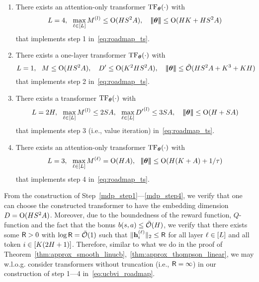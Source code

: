 \begin{enumerate}[label=Step \arabic*,ref= \arabic*]
    \item\label{mdp_step1}There exists an attention-only transformer ${\rm TF}_{\boldsymbol \theta}(\cdot)$ with     $$L=4,~~\max_{\ell\in[L]}M^{(l)}\leq {\mathrm{O}}({H}{S}^2{A}),~~~ {\left|\!\left|\!\left|{{\boldsymbol \theta}}\right|\!\right|\!\right|}\leq {\mathrm{O}}({H}{K}+{H}{S}^2{A}) $$
 that implements step 1 in~\eqref{eq:roadmap_ts}.
   \item \label{mdp_step2}
 There exists a one-layer  transformer ${\rm TF}_{\boldsymbol \theta}(\cdot)$ with
$$
L=1,~~{M}\leq {\mathrm{O}}({H}{S}^2{A}),~~~ {D'}\leq {\mathrm{O}}({K}^2{H}{S}^2{A}),~~~{\left|\!\left|\!\left|{{\boldsymbol \theta}}\right|\!\right|\!\right|}\leq {\tilde{\mathcal O}}({H}{S}^2{A}+{K}^3+{K}{H})
$$
 that implements step 2 in~\eqref{eq:roadmap_ts}.
  \item\label{mdp_step3}  There exists a transformer  ${\rm TF}_{{\boldsymbol \theta}}(\cdot)$ with
    $$L=2{H},~~\max_{\ell\in[L]}M^{(l)}\leq 2{S}{A},~~\max_{\ell\in[L]}{D'}^{(l)}\leq 3{S}{A},~~~ {\left|\!\left|\!\left|{{\boldsymbol \theta}}\right|\!\right|\!\right|}\leq  {\mathrm{O}}({H}+{S}{A}) $$
 that implements step 3 (i.e., value iteration) in~\eqref{eq:roadmap_ts}.
  \item \label{mdp_step4}
 There exists an attention-only transformer ${\rm TF}_{\boldsymbol \theta}(\cdot)$ with
$${L}=3,~~\max_{\ell\in[{L}]}{M}^{(\ell)}={\mathrm{O}}({H}{A}),~~{\left|\!\left|\!\left|{{\boldsymbol \theta}}\right|\!\right|\!\right|}\leq {\mathrm{O}}({H}({K}+{A})+{1}/{{\tau}}) $$
 that implements step 4 in~\eqref{eq:roadmap_ts}.
\end{enumerate}
From the construction of Step~\ref{mdp_step1}---\ref{mdp_step4}, we verify that one can choose the constructed transformer to have the embedding dimension $D={\mathrm{O}}({H}{S}^2{A})$. Moreover, due to the boundedness of the reward function, $Q$-function  and the fact that the bonus ${b}({s},{a})\leq{\tilde{\mathcal O}}({H})$, we verify that there exists some ${\mathsf{R}}>0$ with $\log {\mathsf{R}}={\tilde{\mathcal O}}(1)$ such that $\|{\mathbf h}_i^{{(\ell)}}\|_2\leq {\mathsf{R}}$ for all layer $\ell\in[{L}]$ and all token $i\in[{K}(2{H}+1)]$. Therefore, similar to what we do in the proof of Theorem~\ref{thm:approx_smooth_linucb},~\ref{thm:approx_thompson_linear}, we may w.l.o.g. consider transformers without truncation (i.e.,  ${\mathsf{R}}=\infty$) in our construction of step 1---4 in~\eqref{eq:ucbvi_roadmap}.




